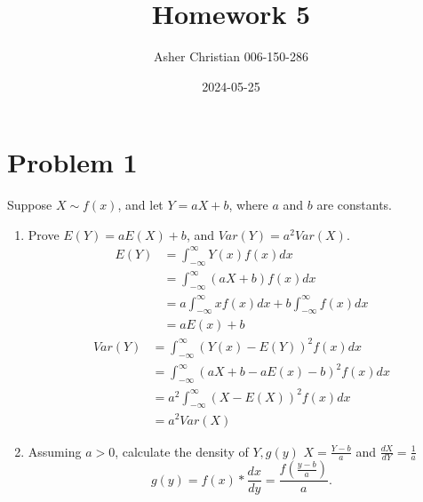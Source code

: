\documentclass{article}
\title{Homework 5}
\author{Asher Christian 006-150-286}
\date{2024-05-25}
\begin{document}
    \maketitle
    \section{Problem 1}
    Suppose $X \sim f(x)$, and let $Y = aX + b$, where $a$ and $b$ are constants.
    \begin{enumerate}
        \item
            Prove $E(Y) = aE(X) + b$, and $Var(Y) = a^2Var(X)$.
            \begin{align*}
                E(Y) &= \int_{-\infty}^{\infty} Y(x)f(x)dx\\ 
                     &= \int_{-\infty}^{\infty}(aX+b)f(x)dx \\ 
                     &= a\int_{-\infty}^{\infty}xf(x)dx + b\int_{-\infty}^{\infty}f(x)dx \\
                     &= aE(x) + b
            \end{align*}
            \begin{align*}
                Var(Y) &= \int_{-\infty}^{\infty}(Y(x)-E(Y))^2f(x)dx \\
                       &= \int_{-\infty}^{\infty}(aX+b-aE(x)-b)^2f(x)dx \\
                       &= a^2\int_{-\infty}^{\infty}(X-E(X))^2f(x)dx \\
                       &= a^2Var(X)
            \end{align*}
        \item
            Assuming $a > 0$, calculate the density of $Y , g(y)$
            $X = \frac{Y-b}{a}$ and $\frac{dX}{dY} = \frac{1}{a}$ 
            \[
            g(y) = f(x)*\frac{dx}{dy} = \frac{f(\frac{y-b}{a})}{a}
            .\] 
    \end{enumerate}
\end{document}
